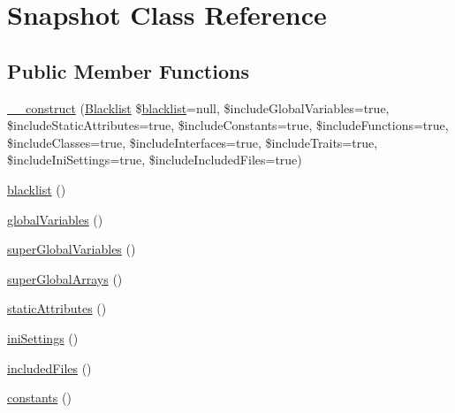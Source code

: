 \hypertarget{class_sebastian_bergmann_1_1_global_state_1_1_snapshot}{}\section{Snapshot Class Reference}
\label{class_sebastian_bergmann_1_1_global_state_1_1_snapshot}
\subsection*{Public Member Functions}
\begin{DoxyCompactItemize}
\item 
\mbox{\hyperlink{class_sebastian_bergmann_1_1_global_state_1_1_snapshot_aeb75284b36ce883a07e7905267cf2dc5}{\+\_\+\+\_\+construct}} (\mbox{\hyperlink{class_sebastian_bergmann_1_1_global_state_1_1_blacklist}{Blacklist}} \$\mbox{\hyperlink{class_sebastian_bergmann_1_1_global_state_1_1_snapshot_a675b0b682623f5e1c766b50c6a53c311}{blacklist}}=null, \$include\+Global\+Variables=true, \$include\+Static\+Attributes=true, \$include\+Constants=true, \$include\+Functions=true, \$include\+Classes=true, \$include\+Interfaces=true, \$include\+Traits=true, \$include\+Ini\+Settings=true, \$include\+Included\+Files=true)
\item 
\mbox{\hyperlink{class_sebastian_bergmann_1_1_global_state_1_1_snapshot_a675b0b682623f5e1c766b50c6a53c311}{blacklist}} ()
\item 
\mbox{\hyperlink{class_sebastian_bergmann_1_1_global_state_1_1_snapshot_acb4c629c8ce68f058ab82b75d8dae561}{global\+Variables}} ()
\item 
\mbox{\hyperlink{class_sebastian_bergmann_1_1_global_state_1_1_snapshot_a6aee689dcf4ff2ada1690926d9d62cde}{super\+Global\+Variables}} ()
\item 
\mbox{\hyperlink{class_sebastian_bergmann_1_1_global_state_1_1_snapshot_a94ec8192a6cb748ee235dcc297a4341a}{super\+Global\+Arrays}} ()
\item 
\mbox{\hyperlink{class_sebastian_bergmann_1_1_global_state_1_1_snapshot_a8c29e76f3cf8533d91f9e8a38710a8a5}{static\+Attributes}} ()
\item 
\mbox{\hyperlink{class_sebastian_bergmann_1_1_global_state_1_1_snapshot_a0d0f1b609f6d807ef24a3d4d71c39959}{ini\+Settings}} ()
\item 
\mbox{\hyperlink{class_sebastian_bergmann_1_1_global_state_1_1_snapshot_a9503b1c034e34eafcf4847b3f4e4dfe2}{included\+Files}} ()
\item 
\mbox{\hyperlink{class_sebastian_bergmann_1_1_global_state_1_1_snapshot_a8fe13d67f83e4c8f01c84aa27f3b6bd0}{constants}} ()

\end{DoxyCompactItemize}
